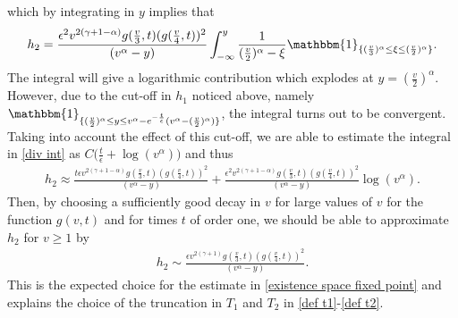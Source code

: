 \documentclass[11pt]{article}
\numberwithin{equation}{section}
\begin{document}
which by integrating in $y$ implies that
\begin{align}\label{div int}
h_{2}=  \frac{\epsilon^{2} v^{2(\gamma+1-\alpha)} g(\frac{v}{3},t)(g(\frac{v}{4},t))^{2}}{(v^{\alpha}-y)}\int_{-\infty}^{y}\frac{1}{(\frac{v}{2})^{\alpha}-\xi}\mathbbm{1}_{\{(\frac{v}{3})^{\alpha}\leq \xi\leq (\frac{v}{2})^{\alpha}\}}.
\end{align}
The integral will give a logarithmic contribution which explodes at $y=(\frac{v}{2})^{\alpha}$. However, due to the cut-off in $h_{1}$ noticed above, namely $\mathbbm{1}_{\{(\frac{v}{2})^{\alpha}\leq y \leq v^{\alpha}-e^{-\frac{t}{\epsilon}}(v^{\alpha}-(\frac{v}{2})^{\alpha})\}}$, the integral turns out to be convergent. Taking into account the effect of this cut-off, we are able to estimate the integral in \eqref{div int} as  $C\big(\frac{t}{\epsilon}+\log(v^{\alpha})\big)$ and thus
\begin{align*}
h_{2}\approx  \frac{t \epsilon v^{2(\gamma+1-\alpha)} g(\frac{v}{3},t)(g(\frac{v}{4},t))^{2}}{(v^{\alpha}-y)}+\frac{ \epsilon^{2} v^{2(\gamma+1-\alpha)} g(\frac{v}{3},t)(g(\frac{v}{4},t))^{2}}{(v^{\alpha}-y)}\log(v^{\alpha}).
\end{align*}
Then, by choosing a sufficiently good decay in $v$ for large values of $v$ for the function $g(v,t)$ and for times $t$ of order one, we should be able to approximate $h_{2}$ for $v\geq 1$ by
\begin{align*}
h_{2}\sim  \frac{ \epsilon v^{2(\gamma+1)} g(\frac{v}{3},t)(g(\frac{v}{4},t))^{2}}{(v^{\alpha}-y)}.
\end{align*}
 This is the expected choice for the estimate in \eqref{existence space fixed point} and explains the choice of the truncation in $T_{1}$ and $T_{2}$ in \eqref{def t1}-\eqref{def t2}.
\end{document}
